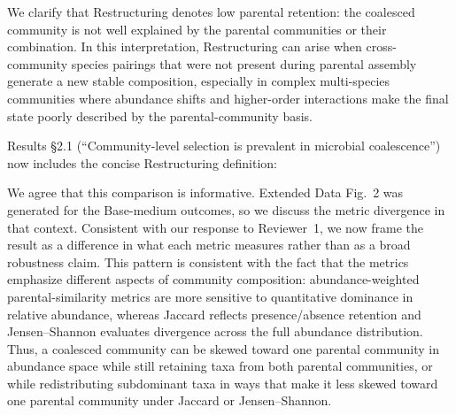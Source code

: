 
We clarify that Restructuring denotes low parental retention: the coalesced community is not well explained by the parental communities or their combination. In this interpretation, Restructuring can arise when cross-community species pairings that were not present during parental assembly generate a new stable composition, especially in complex multi-species communities where abundance shifts and higher-order interactions make the final state poorly described by the parental-community basis.

Results \S2.1 (``Community-level selection is prevalent in microbial coalescence'') now includes the concise Restructuring definition: 


We agree that this comparison is informative. Extended Data Fig.~2 was generated for the Base-medium outcomes, so we discuss the metric divergence in that context. Consistent with our response to Reviewer~1, we now frame the result as a difference in what each metric measures rather than as a broad robustness claim. This pattern is consistent with the fact that the metrics emphasize different aspects of community composition: abundance-weighted parental-similarity metrics are more sensitive to quantitative dominance in relative abundance, whereas Jaccard reflects presence/absence retention and Jensen--Shannon evaluates divergence across the full abundance distribution. Thus, a coalesced community can be skewed toward one parental community in abundance space while still retaining taxa from both parental communities, or while redistributing subdominant taxa in ways that make it less skewed toward one parental community under Jaccard or Jensen--Shannon.

